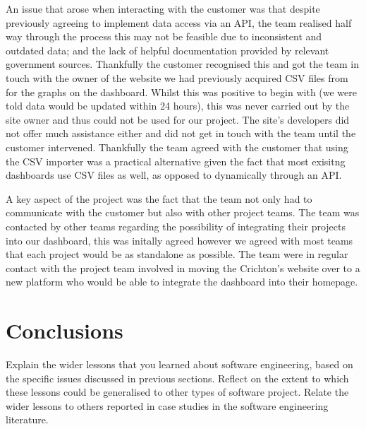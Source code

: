 \documentclass{l3proj}
\begin{document}
An issue that arose when interacting with the customer was that despite previously agreeing to implement data access
via an API, the team realised half way through the process this may not be feasible due to inconsistent and outdated
data; and the lack of helpful documentation provided by relevant government sources. Thankfully the customer recognised
this and got the team in touch with the owner of the website we had previously acquired CSV files from for the graphs on
the dashboard. Whilst this was positive to begin with (we were told data would be updated within 24 hours), this was
never carried out by the site owner and thus could not be used for our project. The site's developers did not offer much
assistance either and did not get in touch with the team until the customer intervened. Thankfully the team agreed with
the customer that using the CSV importer was a practical alternative given the fact that most exisitng dashboards use
CSV files as well, as opposed to dynamically through an API.

A key aspect of the project was the fact that the team not only had to communicate with the customer but also with
other project teams. The team was contacted by other teams regarding the possibility of integrating their projects into
our dashboard, this was initally agreed however we agreed with most teams that each project would be as standalone as
possible. The team were in regular contact with the project team involved in moving the Crichton's website over to a
new platform who would be able to integrate the dashboard into their homepage.


\section{Conclusions}
\label{sec:conclusions}

Explain the wider lessons that you learned about software engineering,
based on the specific issues discussed in previous sections.  Reflect
on the extent to which these lessons could be generalised to other
types of software project.  Relate the wider lessons to others
reported in case studies in the software engineering literature.




\end{document}
